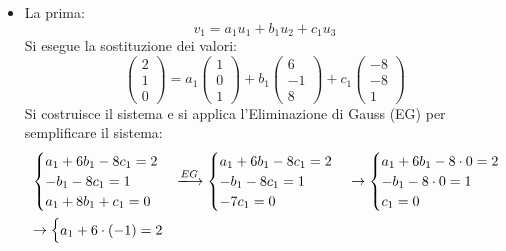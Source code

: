 \documentclass[a4paper]{article}
\begin{document}
	\begin{itemize}
		\item La prima:
		\begin{equation*}
			v_{1} = a_{1} u_{1} + b_{1} u_{2} + c_{1} u_{3}
		\end{equation*}
		Si esegue la sostituzione dei valori:
		\begin{equation*}
			\begin{pmatrix}
				2 \\ 1 \\ 0
			\end{pmatrix} =
			a_{1} \begin{pmatrix}
				1 \\ 0 \\ 1
			\end{pmatrix} +
			b_{1} \begin{pmatrix}
				6 \\ -1 \\ 8
			\end{pmatrix} +
			c_{1} \begin{pmatrix}
				-8 \\ -8 \\ 1
			\end{pmatrix}
		\end{equation*}
		Si costruisce il sistema e si applica l'Eliminazione di Gauss (EG) per semplificare il sistema:
		\begin{equation*}
			\begin{array}{l}
				\begin{cases}
					a_{1} + 6b_{1} - 8c_{1} = 2 \\
					-b_{1} - 8c_{1} = 1 \\
					a_{1} + 8b_{1} + c_{1} = 0
				\end{cases} \xlongrightarrow{EG}
				\begin{cases}
					a_{1} + 6b_{1} - 8c_{1} = 2 \\
					-b_{1} - 8c_{1} = 1 \\
					-7c_{1} = 0
				\end{cases} \rightarrow
				\begin{cases}
					a_{1} + 6b_{1} - 8\cdot0 = 2 \\
					-b_{1} - 8\cdot0 = 1 \\
					c_{1} = 0
				\end{cases} \\ [2em]
				\rightarrow \begin{cases}
					a_{1} + 6 \cdot \left(-1\right) = 2 \\

\end{cases}
\end{array}
\end{equation*}
\end{itemize}
\end{document}
